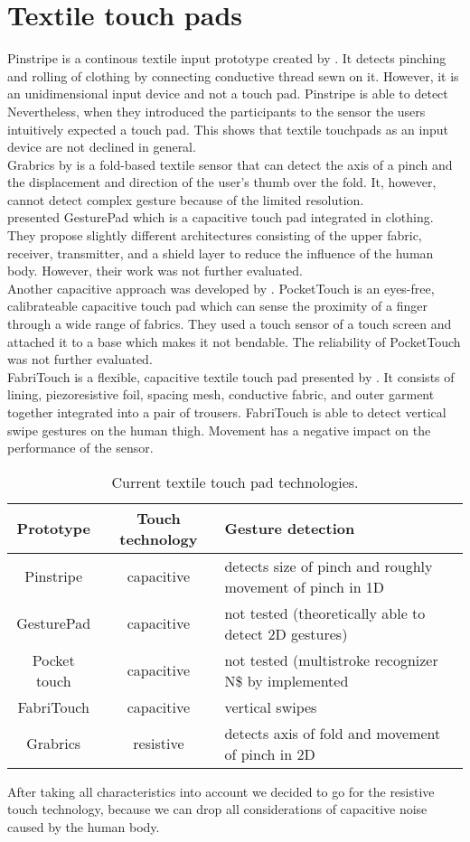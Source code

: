 \section{Textile touch pads}
Pinstripe is a continous textile input prototype created by \cite{Karrer:2010:PEC:1866218.1866255}. It detects pinching and rolling of clothing by connecting conductive thread sewn on it. However, it is an unidimensional input device and not a touch pad. Pinstripe is able to detect  Nevertheless, when they introduced the participants to the sensor the users intuitively expected a touch pad. This shows that  textile touchpads as an input device are not declined in general. \\
Grabrics by \cite{hamdan} is a fold-based textile sensor that can detect the axis of a pinch and the displacement and direction of the user's thumb over the fold. It, however, cannot detect complex gesture because of the limited resolution.\\
\cite{Rekimoto:2001:962092} presented GesturePad which is a capacitive touch pad integrated in clothing. They propose slightly different architectures consisting of the upper fabric, receiver, transmitter, and a shield layer to reduce the influence of the human body. However, their work was not further evaluated. \\
Another capacitive approach was developed by \cite{Saponas:2011:PTC:2047196.2047235}. PocketTouch is an eyes-free, calibrateable capacitive touch pad which can sense the proximity of a finger through a wide range of fabrics. They used a touch sensor of a touch screen and attached it to a base which makes it not bendable. The reliability of PocketTouch was not further evaluated. \\
FabriTouch is a flexible, capacitive textile touch pad presented by \cite{Heller:2014:FEF:2634317.2634345}. It consists of lining, piezoresistive foil, spacing mesh, conductive fabric, and outer garment together integrated into a pair of trousers. FabriTouch is able to detect vertical swipe gestures on the human thigh. Movement has a negative impact on the performance of the sensor.
\begin{table}
\begin{tabular}{|c | c | p{3.8cm}|}
  \hline
  Prototype & Touch technology & Gesture detection \\
  \hline
   Pinstripe & capacitive  & detects size of pinch and roughly movement of pinch in 1D \\
   \hline
  GesturePad & capacitive &  not tested (theoretically able to detect 2D gestures) \\
  \hline
  Pocket touch & capacitive & not tested (multistroke recognizer N\$ by \cite{anthony2012n} implemented \\
  \hline
  FabriTouch & capacitive & vertical swipes \\
  \hline
  Grabrics & resistive & detects axis of fold and movement of pinch in 2D \\ 
  \hline
\end{tabular}
\caption{Current textile touch pad technologies.}
 \label{table:overview}
\end{table}

After taking all characteristics into account we decided to go for the resistive touch technology, because we can drop all considerations of capacitive noise caused by the human body. 